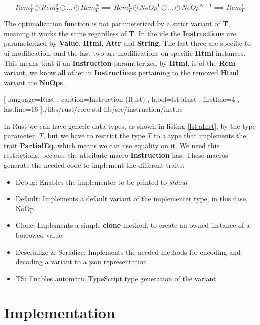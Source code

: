 \begin{equation} \label{eq:apx4}
  Rem_T^1 \odot Rem_T^2 \odot \dots \odot Rem_T^N \implies Rem_T^1 \odot NoOp^1 \odot \dots \odot NoOp^{N - 1} \implies Rem_T^1
\end{equation}

The optimalization function is not parameterized by a strict variant of
\textbf{T}, meaning it works the same regardless of \textbf{T}. In the
\gls*{ide} the \textbf{Instruction}s are parameterized by \textbf{Value},
\textbf{Html}, \textbf{Attr} and \textbf{String}. The last three are specific to
\gls*{ui} modification, and the last two are modifications on specific
\textbf{Html} instances. This means that if an \textbf{Instruction}
parameterized by \textbf{Html}, is of the \textbf{Rem} variant, we know all
other \gls*{ui} \textbf{Instruction}s pertaining to the removed \textbf{Html}
variant are \textbf{NoOp}s.

\begin{code}[H]
  
   [ language=Rust
   , caption={Instruction (Rust)}
   , label=lst:aInst
   , firstline=4
   , lastline=16
   ]{./libs/rust/core-std-lib/src/instruction/inst.rs}
\end{code}

In Rust we can have generic data types, as shown in listing \ref{lst:aInst}, by
the type parameter, $T$, but we have to restrict the type $T$ to a type that
implements the trait \textbf{PartialEq}, which means we can use equality on it.
We need this restrictions, because the attribute macro \textbf{Instruction} has.
These macros generate the needed code to implement the different traits:

\begin{itemize}
  \item Debug: Enables the implementer to be printed to \textit{stdout}
  \item Default: Implements a default variant of the implementer type, in this
    case, NoOp
  \item Clone: Implements a simple \textbf{clone} method, to create an owned
    instance of a borrowed value
  \item Deserialize \& Serialize: Implements the needed methods for encoding
    and decoding a variant to a \gls{json} representation
  \item TS: Enables automatic TypeScript type generation of the variant
\end{itemize}


\section{Implementation}

